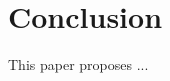 \documentclass[conference]{IEEEtran}
\begin{document}
	
	\section{Conclusion} \label{sec:conclusion}
	This paper proposes ...

	
	
 
	    
	
	
	
	
	
	
	
		
		
		
		
\end{document}
